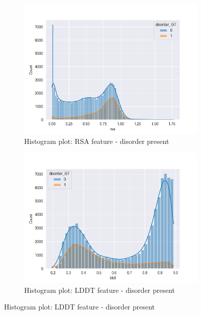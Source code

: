 \begin{figure}
    \begin{subfigure}{0.6\linewidth}
        \includegraphics[width=\linewidth]{res/analysis/plots/hue-histplot_rsa.png}
        \caption{Histogram plot: RSA feature - disorder present}
    \end{subfigure}
    \begin{subfigure}{0.6\linewidth}
        \includegraphics[width=\linewidth]{res/analysis/plots/hue-histplot_lddt.png}
        \caption{Histogram plot: LDDT feature - disorder present}
    \end{subfigure}

\end{figure}

